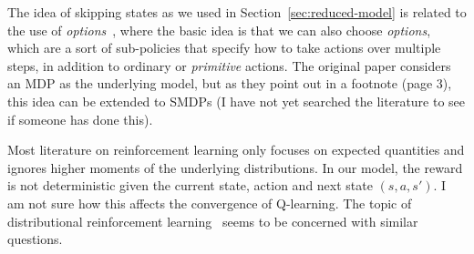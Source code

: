 \documentclass{article}
\theoremstyle{definition}
\theoremstyle{plain}
\begin{document}
The idea of skipping states as we used in Section~\ref{sec:reduced-model} is
related to the use of \textit{options}~\citep{suttonMDPsSemiMDPsFramework1999},
where the basic idea is that we can also choose \textit{options}, which are a
sort of sub-policies that specify how to take actions over multiple steps, in
addition to ordinary or \textit{primitive} actions. The original paper considers
an MDP as the underlying model, but as they point out in a footnote (page 3),
this idea can be extended to SMDPs (I have not yet searched the literature to
see if someone has done this).

Most literature on reinforcement learning only focuses on expected quantities
and ignores higher moments of the underlying distributions. In our model, the
reward is not deterministic given the current state, action and next state
$(s, a, s')$. I am not sure how this affects the convergence of Q-learning. The
topic of distributional reinforcement
learning~\citep{bellemareDistributionalPerspectiveReinforcement2017,bdr2023}
seems to be concerned with similar questions.




\end{document}
